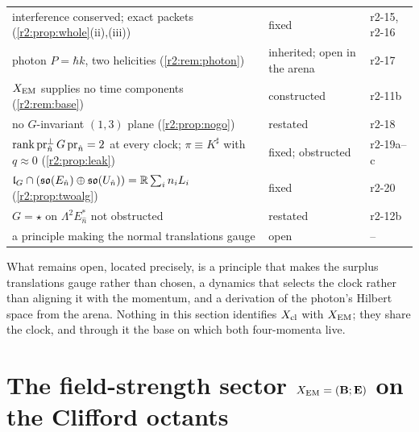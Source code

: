 {\begin{longtable}{@{}>{\raggedright\arraybackslash}p{9.0cm}>{\raggedright\arraybackslash}p{2.8cm}>{\raggedright\arraybackslash}p{2.6cm}@{}}
interference conserved; exact packets (\cref{r2:prop:whole}(ii),(iii)) & fixed & r2-15, r2-16\\
photon $P=\hbar k$, two helicities (\cref{r2:rem:photon}) & inherited; open in the arena & r2-17\\
$X_{\rm EM}$ supplies no time components (\cref{r2:rem:base}) & constructed & r2-11b\\
no $G$-invariant $(1,3)$ plane (\cref{r2:prop:nogo}) & restated & r2-18\\
$\operatorname{rank}\operatorname{pr}^{\perp}_{\hat n}G\operatorname{pr}_{\hat n}=2$ at every clock; $\pi\equiv K^\sharp$ with $q\approx0$ (\cref{r2:prop:leak}) & fixed; obstructed & r2-19a--c\\
$\mathfrak l_G\cap(\mathfrak{so}(E_{\hat n})\oplus\mathfrak{so}(U_{\hat n}))=\mathbb{R}\sum_in_iL_i$ (\cref{r2:prop:twoalg}) & fixed & r2-20\\
$G=\star$ on $\Lambda^2E_{\hat n}^*$ not obstructed & restated & r2-12b\\
a principle making the normal translations gauge & open & --\\
\bottomrule
\end{longtable}}

What remains open, located precisely, is a principle that makes the surplus translations gauge rather than
chosen, a dynamics that selects the clock rather than aligning it with the momentum, and a derivation of the photon's Hilbert space from the arena. Nothing
in this section identifies $X_{\rm cl}$ with $X_{\rm EM}$; they share the clock, and through it the base on which both four-momenta live.


\section{\texorpdfstring{The field-strength sector $X_{\rm EM}=(\mathbf B;\mathbf E)$ on the Clifford octants}{The field-strength sector X\_EM = (B;E) on the Clifford octants}}
\label{r3:sec:main}

